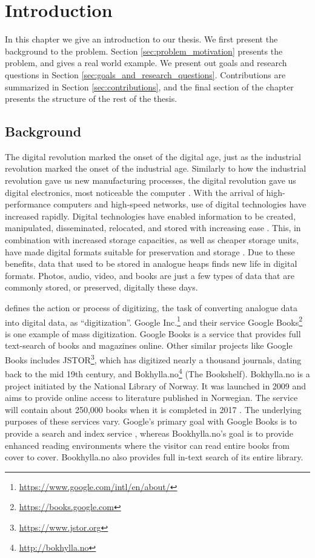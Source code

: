 
\chapter{Introduction}
\label{ch:introduction}
In this chapter we give an introduction to our thesis. We first present the background to the problem. Section \ref{sec:problem_motivation} presents the problem, and gives a real world example. We present out goals and research questions in Section \ref{sec:goals_and_research_questions}. Contributions are summarized in Section \ref{sec:contributions}, and the final section of the chapter presents the structure of the rest of the thesis.

\section{Background}
The digital revolution marked the onset of the digital age, just as the industrial revolution marked the onset of the industrial age. Similarly to how the industrial revolution gave us new manufacturing processes, the digital revolution gave us digital electronics, most noticeable the computer \citep{freeman2001time}. With the arrival of high-performance computers and high-speed networks, use of digital technologies have increased rapidly. Digital technologies have enabled information to be created, manipulated, disseminated, relocated, and stored with increasing ease \citep{lee2002state}. This, in combination with increased storage capacities, as well as cheaper storage units, have made digital formats suitable for preservation and storage \citep{morris2003evolution}. Due to these benefits, data that used to be stored in analogue heaps finds new life in digital formats. Photos, audio, video, and books are just a few types of data that are commonly stored, or preserved, digitally these days.

\cite{misc-oed-digitization} defines the action or process of digitizing, the task of converting analogue data into digital data, as ``digitization''. Google Inc.\footnote{\url{https://www.google.com/intl/en/about/}} and their service Google Books\footnote{\url{https://books.google.com}} is one example of mass digitization. Google Books is a service that provides full text-search of books and magazines online. Other similar projects like Google Books includes JSTOR\footnote{\url{https://www.jstor.org}}, which has digitized nearly a thousand journals, dating back to the mid 19th century, and Bokhylla.no\footnote{\url{http://bokhylla.no}} (The Bookshelf). Bokhylla.no is a project initiated by the National Library of Norway. It was launched in 2009 and aims to provide online access to literature published in Norwegian. The service will contain about 250,000 books when it is completed in 2017 \citep{misc-nb-digial-library}. The underlying purposes of these services vary. Google's primary goal with Google Books is to provide a search and index service \citep{coyle2006mass}, whereas Bookhylla.no's goal is to provide enhanced reading environments where the visitor can read entire books from cover to cover. Bookhylla.no also provides full in-text search of its entire library. 

